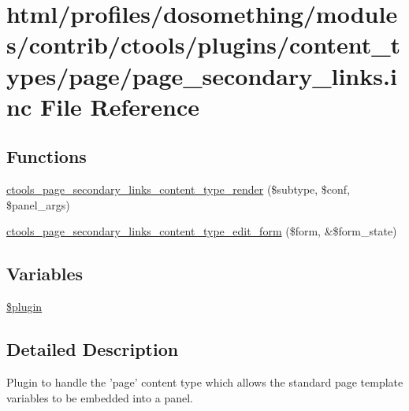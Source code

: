 \hypertarget{page__secondary__links_8inc}{
\section{html/profiles/dosomething/modules/contrib/ctools/plugins/content\_\-types/page/page\_\-secondary\_\-links.inc File Reference}
\label{page__secondary__links_8inc}
}
\subsection*{Functions}
\begin{DoxyCompactItemize}
\item 
\hyperlink{page__secondary__links_8inc_a2164c92a3692b3cf0fd91cef460f6c80}{ctools\_\-page\_\-secondary\_\-links\_\-content\_\-type\_\-render} (\$subtype, \$conf, \$panel\_\-args)
\item 
\hyperlink{page__secondary__links_8inc_a9412679882decfc17a4701f5bedabd98}{ctools\_\-page\_\-secondary\_\-links\_\-content\_\-type\_\-edit\_\-form} (\$form, \&\$form\_\-state)
\end{DoxyCompactItemize}
\subsection*{Variables}
\begin{DoxyCompactItemize}
\item 
\hyperlink{page__secondary__links_8inc_ada8a7130088351710bb02ed622d6bf65}{\$plugin}
\end{DoxyCompactItemize}


\subsection{Detailed Description}
Plugin to handle the 'page' content type which allows the standard page template variables to be embedded into a panel. 

